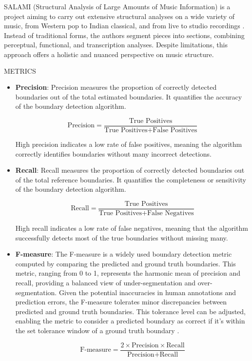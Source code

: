 
SALAMI (Structural Analysis of Large Amounts of Music Information) is a project aiming to carry out extensive structural analyses on a wide variety of music, from Western pop to Indian classical, and from live to studio recordings \cite{Smith2011DESIGNANNOTATIONS}. Instead of traditional forms, the authors segment pieces into sections, combining perceptual, functional, and transcription analyses. Despite limitations, this approach offers a holistic and nuanced perspective on music structure.

METRICS

\begin{itemize}
    \item \textbf{Precision}: Precision measures the proportion of correctly detected boundaries out of the total estimated boundaries. It quantifies the accuracy of the boundary detection algorithm.
    
    \[
    \text{Precision} = \frac{\text{True Positives}}{\text{True Positives} + \text{False Positives}}
    \]
    
    High precision indicates a low rate of false positives, meaning the algorithm correctly identifies boundaries without many incorrect detections.
    
    \item \textbf{Recall}: Recall measures the proportion of correctly detected boundaries out of the total reference boundaries. It quantifies the completeness or sensitivity of the boundary detection algorithm.
    
    \[
    \text{Recall} = \frac{\text{True Positives}}{\text{True Positives} + \text{False Negatives}}
    \]
    
    High recall indicates a low rate of false negatives, meaning that the algorithm successfully detects most of the true boundaries without missing many.
    
    \item \textbf{F-measure}: The F-measure is a widely used boundary detection metric computed by comparing the predicted and ground truth boundaries. This metric, ranging from 0 to 1, represents the harmonic mean of precision and recall, providing a balanced view of under-segmentation and over-segmentation. Given the potential inaccuracies in human annotations and prediction errors, the F-measure tolerates minor discrepancies between predicted and ground truth boundaries. This tolerance level can be adjusted, enabling the metric to consider a predicted boundary as correct if it's within the set tolerance window of a ground truth boundary \cite{Turnbull2007ABOOSTING}. 
    
    \[
    \text{F-measure} = \frac{2 \times \text{Precision} \times \text{Recall}}{\text{Precision} + \text{Recall}}
    \]
\end{itemize}


